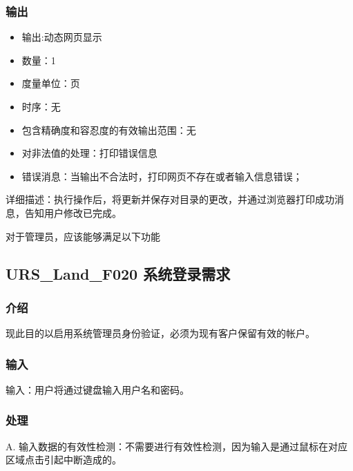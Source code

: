 				  \subsubsection{输出}
				  \begin{itemize}
					  \item	输出:动态网页显示
					  \item	数量：1
					  \item	度量单位：页
					  \item	时序：无
					  \item	包含精确度和容忍度的有效输出范围：无
					  \item	对非法值的处理：打印错误信息
					  \item	错误消息：当输出不合法时，打印网页不存在或者输入信息错误；
					 \end{itemize}
					 详细描述：执行操作后，将更新并保存对目录的更改，并通过浏览器打印成功消息，告知用户修改已完成。



			
对于管理员，应该能够满足以下功能

\subsection{URS\_Land\_F020 系统登录需求}

\subsubsection{介绍}
现此目的以启用系统管理员身份验证，必须为现有客户保留有效的帐户。

\subsubsection{输入}

输入：用户将通过键盘输入用户名和密码。

\subsubsection{处理}



A. 输入数据的有效性检测：不需要进行有效性检测，因为输入是通过鼠标在对应区域点击引起中断造成的。

